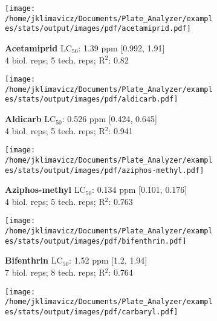 \documentclass{article}
\author{James Klimavicz}
\date{\today}
\begin{document}
\begin{figure}[thp!]
   \begin{subfigure}{0.500\textwidth}
      \centering
      \texttt{[image: /home/jklimavicz/Documents/Plate\_Analyzer/examples/stats/output/images/pdf/acetamiprid.pdf]}
      \vspace{-0.05cm}
      \caption*{\textbf{Acetamiprid} LC$_{50}$: 1.39 ppm [0.992, 1.91] \\ 
4 biol. reps; 5 tech. reps; R$^2$: 0.82}
      \vspace{0.1cm}
   \end{subfigure}%
   \begin{subfigure}{0.500\textwidth}
      \centering
      \texttt{[image: /home/jklimavicz/Documents/Plate\_Analyzer/examples/stats/output/images/pdf/aldicarb.pdf]}
      \vspace{-0.05cm}
      \caption*{\textbf{Aldicarb} LC$_{50}$: 0.526 ppm [0.424, 0.645] \\ 
4 biol. reps; 5 tech. reps; R$^2$: 0.941}
      \vspace{0.1cm}
   \end{subfigure}%
\vspace{-0.1cm}
   \begin{subfigure}{0.500\textwidth}
      \centering
      \texttt{[image: /home/jklimavicz/Documents/Plate\_Analyzer/examples/stats/output/images/pdf/aziphos-methyl.pdf]}
      \vspace{-0.05cm}
      \caption*{\textbf{Aziphos-methyl} LC$_{50}$: 0.134 ppm [0.101, 0.176] \\ 
4 biol. reps; 5 tech. reps; R$^2$: 0.763}
      \vspace{0.1cm}
   \end{subfigure}%
   \begin{subfigure}{0.500\textwidth}
      \centering
      \texttt{[image: /home/jklimavicz/Documents/Plate\_Analyzer/examples/stats/output/images/pdf/bifenthrin.pdf]}
      \vspace{-0.05cm}
      \caption*{\textbf{Bifenthrin} LC$_{50}$: 1.52 ppm [1.2, 1.94] \\ 
7 biol. reps; 8 tech. reps; R$^2$: 0.764}
      \vspace{0.1cm}
   \end{subfigure}%
\vspace{-0.1cm}
   \begin{subfigure}{0.500\textwidth}
      \centering
      \texttt{[image: /home/jklimavicz/Documents/Plate\_Analyzer/examples/stats/output/images/pdf/carbaryl.pdf]}

\end{subfigure}
\end{figure}
\end{document}
